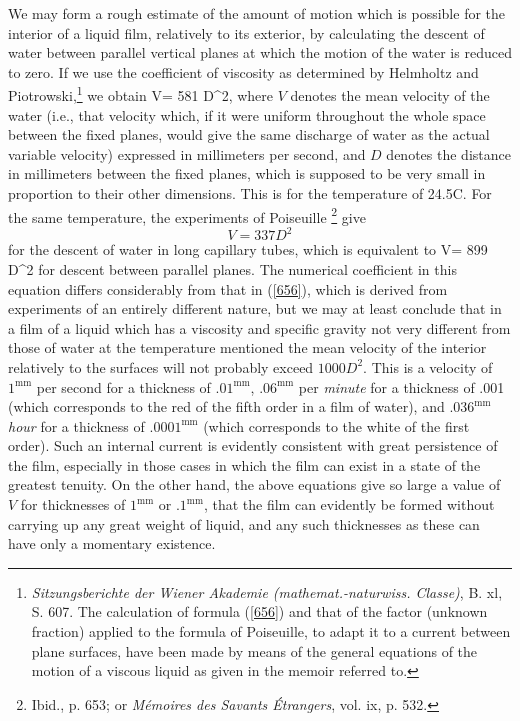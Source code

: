 \documentclass[12pt]{article}
\begin{document}
We may form a rough estimate of the amount of motion which is possible for the interior of a liquid film, relatively to its exterior, by calculating the descent of water between parallel vertical planes at which the motion of the water is reduced to zero. If we use the coefficient of viscosity as determined by Helmholtz and Piotrowski,\footnote{\textit{Sitzungsberichte der Wiener Akademie (mathemat.-naturwiss. Classe)}, B. xl, S. 607. The calculation of formula (\ref{656}) and that of the factor (unknown fraction) %
applied to the formula of Poiseuille, to adapt it to a current between plane surfaces, have been made by means of the general equations of the motion of a viscous liquid as given in the memoir referred to.} we obtain
\eqs V= 581 D^2,    \label{656} \eqe
where $V$ denotes the mean velocity of the water (i.e., that velocity
which, if it were uniform throughout the whole space between the fixed planes, would give the same discharge of water as the actual variable velocity) expressed in millimeters per second, and $D$ denotes the distance in millimeters between the fixed planes, which is supposed to be very small in proportion to their other dimensions. This is for the temperature of 24.5\degree C. For the same temperature, the experiments of Poiseuille \footnote{Ibid., p. 653; or \textit{M\'{e}moires des Savants \'{E}trangers}, vol. ix, p. 532.} give
$$V= 337 D^2$$
for the descent of water in long capillary tubes, which is equivalent to
\eqs V= 899 D^2   \label{657} \eqe
for descent between parallel planes. The numerical coefficient in this equation differs considerably from that in (\ref{656}), which is derived from experiments of an entirely different nature, but we may at least conclude that in a film of a liquid which has a viscosity and specific gravity not very different from those of water at the temperature mentioned the mean velocity of the interior relatively to the surfaces will not probably exceed $1000 D^2$. This is a velocity of $1^{\text{mm}}$ per second for a thickness of $.01^{\text{mm}}$, $.06^{\text{mm}}$ per \textit{minute} for a thickness of .001 (which corresponds to the red of the fifth order in a film of water), and $.036^{\text{mm}}$ \textit{hour} for a thickness of $.0001^{\text{mm}}$ (which corresponds to the white of the first order). Such an internal current is evidently consistent with great persistence of the film, especially in those cases in which the film can exist in a state of the greatest tenuity. On the other hand, the above equations give so large a value of $V$ for thicknesses of $1^{\text{mm}}$ or $.1^{\text{mm}}$, that the film can evidently be formed without carrying up any great weight of liquid, and any such thicknesses as these can have only a momentary existence.
\end{document}
